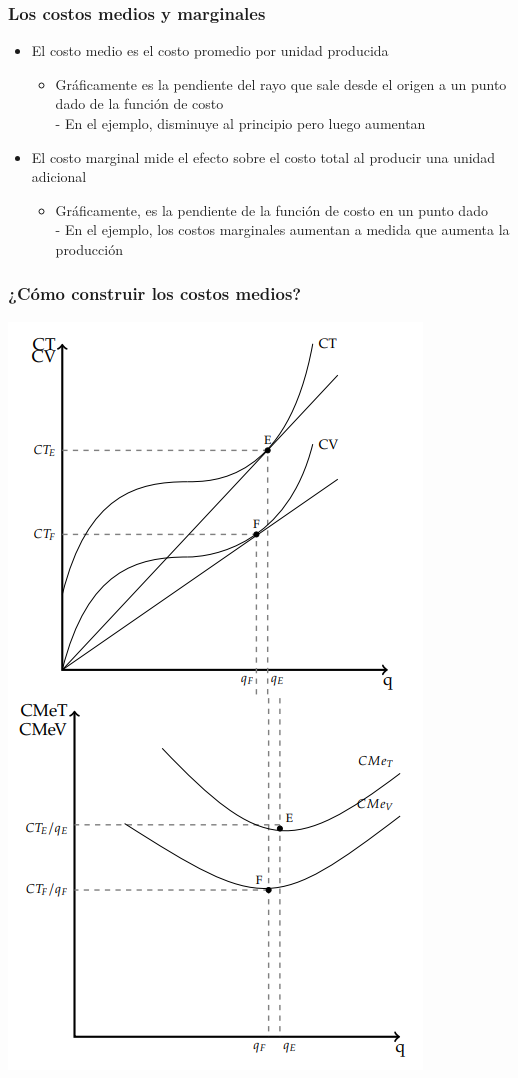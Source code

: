 \documentclass{beamer}
\begin{document}
\begin{frame}
\frametitle{Los costos medios y marginales}
\begin{itemize}
    \item El costo medio es el costo promedio por unidad producida
    \begin{itemize}
        \item Gráficamente es la pendiente del rayo que sale desde el origen a un punto dado de la función de costo \\
        - En el ejemplo, disminuye al principio pero luego aumentan 
    \end{itemize}
    \item El costo marginal mide el efecto sobre el costo total al producir una unidad adicional
    \begin{itemize}
        \item Gráficamente, es la pendiente de la función de costo en un punto dado \\
        - En el ejemplo, los costos marginales aumentan a medida que aumenta la producción
    \end{itemize}
\end{itemize}
\end{frame}

\begin{frame}
\frametitle{¿Cómo construir los costos medios?}
\centering
\includegraphics[scale=0.5]{../Figures/C13.6.png}
\end{frame}
\end{document}
